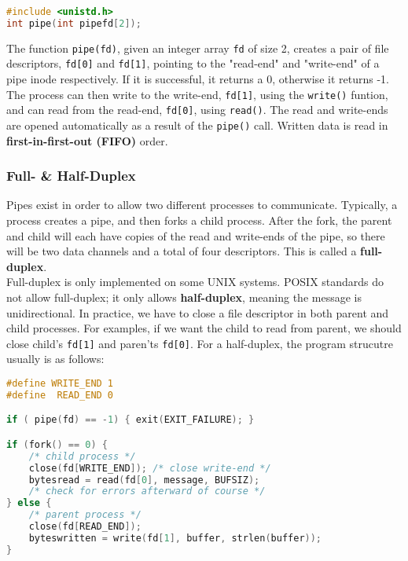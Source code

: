 \documentclass{article}
\newcommand{\bold}[1]{\textbf{#1}}
\newcommand{\code}[1]{\texttt{#1}}
\begin{document}
\begin{lstlisting}[language=C]
#include <unistd.h>
int pipe(int pipefd[2]);
\end{lstlisting}

\noindent The function \code{pipe(fd)}, given an integer array \code{fd} of size 2, creates a pair of file descriptors, \code{fd[0]} and \code{fd[1]}, pointing to the "read-end" and "write-end" of a pipe inode respectively. If it is successful, it returns a 0, otherwise it returns -1. The process can then write to the write-end, \code{fd[1]}, using the \code{write()} funtion, and can read from the read-end, \code{fd[0]}, using \code{read()}. The read and write-ends are opened automatically as a result of the \code{pipe()} call. Written data is read in \bold{first-in-first-out (FIFO)} order. 

\subsubsection{Full- \& Half-Duplex}

Pipes exist in order to allow two different processes to communicate. Typically, a process creates a pipe, and then forks a child process. After the fork, the parent and child will each have copies of the read and write-ends of the pipe, so there will be two data channels and a total of four descriptors. This is called a \bold{full-duplex}. \\ 

\noindent Full-duplex is only implemented on some UNIX systems. POSIX standards do not allow full-duplex; it only allows \bold{half-duplex}, meaning the message is unidirectional. In practice, we have to close a file descriptor in both parent and child processes. For examples, if we want the child to read from parent, we should close child's \code{fd[1]} and paren'ts \code{fd[0]}. For a half-duplex, the program strucutre usually is as follows:

\begin{lstlisting}[language=C]
#define WRITE_END 1
#define  READ_END 0

if ( pipe(fd) == -1) { exit(EXIT_FAILURE); }

if (fork() == 0) {
    /* child process */ 
    close(fd[WRITE_END]); /* close write-end */
    bytesread = read(fd[0], message, BUFSIZ);
    /* check for errors afterward of course */ 
} else {
    /* parent process */
    close(fd[READ_END]);
    byteswritten = write(fd[1], buffer, strlen(buffer));
}
\end{lstlisting}
\end{document}
